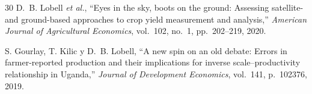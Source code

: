 \begin{thebibliography}{30}
D.~B. Lobell \emph{et al.}, ``Eyes in the sky, boots on the ground: Assessing satellite- and ground-based approaches to
crop yield measurement and analysis,'' \emph{American Journal of Agricultural Economics}, vol.~102, no.~1,
pp.~202--219, 2020.

S. Gourlay, T. Kilic y D.~B. Lobell, ``A new spin on an old debate: Errors in farmer-reported production and their
implications for inverse scale--productivity relationship in Uganda,'' \emph{Journal of Development Economics},
vol.~141, p.~102376, 2019.

\end{thebibliography}
